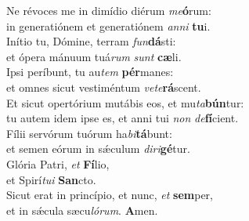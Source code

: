 \oddverse Ne révoces me in dimídio diérum \textit{me}\textbf{ó}rum:~\*\\
\oddverse in generatiónem et generatiónem \textit{an}\textit{ni} \textbf{tu}i.\\
\evenverse Inítio tu, Dómine, terram \textit{fun}\textbf{dá}sti:~\*\\
\evenverse et ópera mánuum tuá\textit{rum} \textit{sunt} \textbf{cæ}li.\\
\oddverse Ipsi períbunt, tu au\textit{tem} \textbf{pér}manes:~\*\\
\oddverse et omnes sicut vestiméntum \textit{ve}\textit{te}\textbf{rá}scent.\\
\evenverse Et sicut opertórium mutábis eos, et mu\textit{ta}\textbf{bún}tur:~\*\\
\evenverse tu autem idem ipse es, et anni tui \textit{non} \textit{de}\textbf{fí}cient.\\
\oddverse Fílii servórum tuórum ha\textit{bi}\textbf{tá}bunt:~\*\\
\oddverse et semen eórum in sǽculum \textit{di}\textit{ri}\textbf{gé}tur.\\
\evenverse Glória Patri, \textit{et} \textbf{Fí}lio,~\*\\
\evenverse et Spirí\textit{tu}\textit{i} \textbf{San}cto.\\
\oddverse Sicut erat in princípio, et nunc, \textit{et} \textbf{sem}per,~\*\\
\oddverse et in sǽcula sæcu\textit{ló}\textit{rum}. \textbf{A}men.\\
